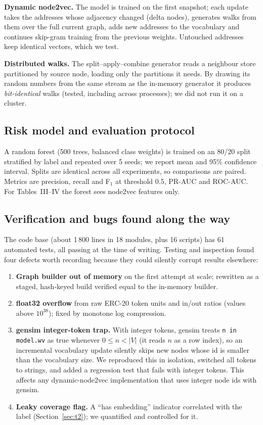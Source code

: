 \documentclass[11pt,a4paper]{article}
\begin{document}
\textbf{Dynamic node2vec.} The model is trained on the first snapshot; each update takes the addresses whose adjacency changed (delta nodes), generates walks from them over the full current graph, adds new addresses to the vocabulary and continues skip-gram training from the previous weights. Untouched addresses keep identical vectors, which we test.

\textbf{Distributed walks.} The split--apply--combine generator reads a neighbour store partitioned by source node, loading only the partitions it needs. By drawing its random numbers from the same stream as the in-memory generator it produces \emph{bit-identical} walks (tested, including across processes); we did not run it on a cluster.

\subsection{Risk model and evaluation protocol}
A random forest (500 trees, balanced class weights) is trained on an 80/20 split stratified by label and repeated over 5 seeds; we report mean and 95\% confidence interval. Splits are identical across all experiments, so comparisons are paired. Metrics are precision, recall and F$_1$ at threshold 0.5, PR-AUC and ROC-AUC. For Tables~III--IV the forest sees node2vec features only.

\subsection{Verification and bugs found along the way}
The code base (about 1\,800 lines in 18 modules, plus 16 scripts) has 61 automated tests, all passing at the time of writing. Testing and inspection found four defects worth recording because they could silently corrupt results elsewhere:
\begin{enumerate}
\item \textbf{Graph builder out of memory} on the first attempt at scale; rewritten as a staged, hash-keyed build verified equal to the in-memory builder.
\item \textbf{float32 overflow} from raw ERC-20 token units and in/out ratios (values above $10^{38}$); fixed by monotone log compression.
\item \textbf{gensim integer-token trap.} With integer tokens, gensim treats \texttt{n in model.wv} as true whenever $0\le n<|V|$ (it reads $n$ as a row index), so an incremental vocabulary update silently skips new nodes whose id is smaller than the vocabulary size. We reproduced this in isolation, switched all tokens to strings, and added a regression test that fails with integer tokens. This affects any dynamic-node2vec implementation that uses integer node ids with gensim.
\item \textbf{Leaky coverage flag.} A ``has embedding'' indicator correlated with the label (Section~\ref{sec:t2}); we quantified and controlled for it.
\end{enumerate}
\end{document}
